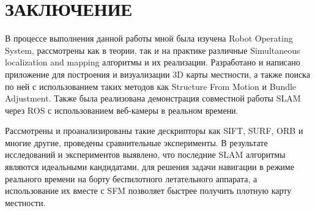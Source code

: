 \chapter*{ЗАКЛЮЧЕНИЕ}

В процессе выполнения данной работы мной была изучена Robot Operating System, рассмотрены как в теории, так и на практике различные Simultaneous localization and mapping алгоритмы и их реализации. Разработано и написано приложение для построения и визуализации 3D карты местности, а также поиска по ней с использованием таких методов как Structure From Motion и Bundle Adjustment. Также была реализована демонстрация совместной работы SLAM через ROS с использованием веб-камеры в реальном времени.

Рассмотрены и проанализированы такие дескрипторы как SIFT, SURF, ORB и многие другие, проведены сравнительные эксперименты. В результате исследований и экспериментов выявлено, что последние SLAM алгоритмы являются идеальными кандидатами, для решения задачи навигации в режиме реального времени на борту беспилотного летательного аппарата, а использование их вместе с SFM позволяет быстрее получить плотную карту местности.
\newpage
